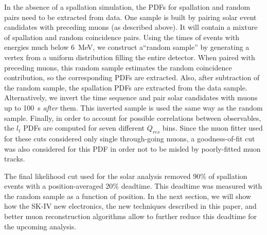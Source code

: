 In the absence of a spallation simulation, the PDFs for spallation and random pairs need to be extracted from data. One sample is built by pairing solar event candidates with preceding muons (as described above). It will contain a mixture of spallation and random coincidence pairs. Using the times of events with energies much below 6~MeV, we construct a``random sample'' by generating a vertex from a uniform distribution filling the entire detector. When paired with preceding muons, this random sample estimates the random coincidence contribution, so the corresponding PDFs are extracted. Also, after subtraction of the random sample, the spallation PDFs are extracted from the data sample. Alternatively, we invert the time sequence and pair solar candidates with muons up to 100~s \emph{after} them. This inverted sample is used the same way as the random sample. Finally, in order to account for possible correlations between observables, the $l_t$ PDFs are computed for seven different $Q_{res}$ bins. Since the muon fitter used for these cuts considered only single through-going muons, a goodness-of-fit cut was also considered for this PDF in order not to be misled by poorly-fitted muon tracks. 

The final likelihood cut used for the solar analysis removed 90\% of spallation events with a position-averaged 20\% deadtime. This deadtime was measured with the random sample as a function of position. In the next section, we will show how the SK-IV new electronics, the new techniques described in this paper, and better muon reconstruction algorithms allow to further reduce this deadtime for the upcoming analysis.